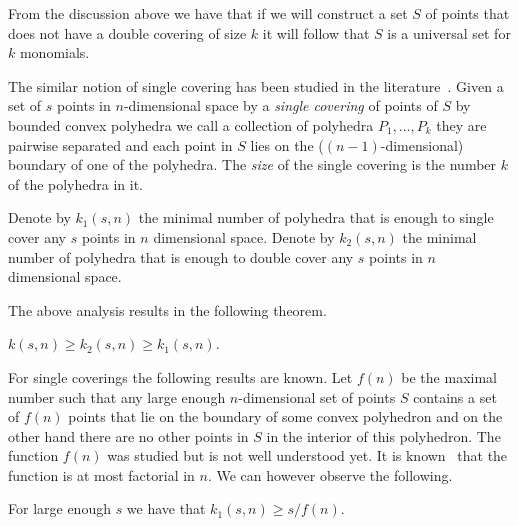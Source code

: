 \documentclass[11pt]{article}
\begin{document}
From the discussion above we have that if we will construct a set $S$ of points that does not have a double covering of size $k$ it will follow that $S$ is a universal set for $k$ monomials. 

The similar notion of single covering has been studied in the literature~\cite[page~367]{BMP05book}. Given a set of $s$ points in $n$-dimensional space by a \emph{single covering} of points of $S$ by bounded convex polyhedra we call a collection of polyhedra $P_1,\ldots, P_k$ they are pairwise separated and each point in $S$ lies on the ($(n-1)$-dimensional) boundary of one of the polyhedra. The \emph{size} of the single covering is the number $k$ of the polyhedra in it.  

Denote by $k_1(s,n)$ the minimal number of polyhedra that is enough  to single cover any $s$ points in $n$ dimensional space.
Denote by $k_2(s,n)$ the minimal number of polyhedra that is enough  to double cover any $s$ points in $n$ dimensional space.

The above analysis results in the following theorem.
\begin{theorem} \label{thm:covering_connection}
$k(s,n) \geq k_2(s,n) \geq k_1(s,n)$.
\end{theorem}

For single coverings the following results are known.
Let $f(n)$ be the maximal number such that any large enough $n$-dimensional set of points $S$ contains a set of $f(n)$ points that lie on the boundary of some convex polyhedron and on the other hand there are no other points in $S$ in the interior of this polyhedron. The function $f(n)$ was studied but is not well understood yet. It is known~\cite{Valtr92} that the function is at most factorial in $n$. We can however observe the following.



\begin{lemma} \label{lem:single_covering_trivial}
For large enough $s$ we have that $k_1(s,n) \geq s/f(n)$.
\end{lemma}
\end{document}
